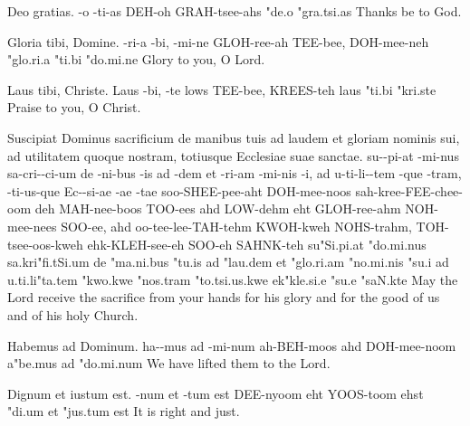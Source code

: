 \newcommand{\LowMassKyriePattern}{Priest K -- \textbf{server K} -- priest K;
\textbf{server C} -- priest C -- \textbf{server C};
priest K -- \textbf{server K} -- priest K.}


  {Deo gratias.}
  {-o -ti-as}
  {DEH-oh GRAH-tsee-ahs}
  {"de.o "gra.tsi.as}
  {Thanks be to God.}

  {Gloria tibi, Domine.}
  {-ri-a -bi, -mi-ne}
  {GLOH-ree-ah TEE-bee, DOH-mee-neh}
  {"glo.ri.a "ti.bi "do.mi.ne}
  {Glory to you, O Lord.}

  {Laus tibi, Christe.}
  {Laus -bi, -te}
  {lows TEE-bee, KREES-teh}
  {laus "ti.bi "kri.ste}
  {Praise to you, O Christ.}

  {Suscipiat Dominus sacrificium de manibus tuis ad laudem et gloriam nominis sui, ad utilitatem quoque nostram, totiusque Ecclesiae suae sanctae.}
  {su--pi-at -mi-nus sa-cri--ci-um de -ni-bus -is ad -dem et -ri-am -mi-nis -i, ad u-ti-li--tem -que -tram, -ti-us-que Ec--si-ae -ae -tae}
  {soo-SHEE-pee-aht DOH-mee-noos sah-kree-FEE-chee-oom deh MAH-nee-boos TOO-ees ahd LOW-dehm eht GLOH-ree-ahm NOH-mee-nees SOO-ee, ahd oo-tee-lee-TAH-tehm KWOH-kweh NOHS-trahm, TOH-tsee-oos-kweh ehk-KLEH-see-eh SOO-eh SAHNK-teh}
  {su"Si.pi.at "do.mi.nus sa.kri"fi.tSi.um de "ma.ni.bus "tu.is ad "lau.dem et "glo.ri.am "no.mi.nis "su.i ad u.ti.li"ta.tem "kwo.kwe "nos.tram "to.tsi.us.kwe ek"kle.si.e "su.e "saN.kte}
  {May the Lord receive the sacrifice from your hands for his glory and for the good of us and of his holy Church.}

  {Habemus ad Dominum.}
  {ha--mus ad -mi-num}
  {ah-BEH-moos ahd DOH-mee-noom}
  {a"be.mus ad "do.mi.num}
  {We have lifted them to the Lord.}

  {Dignum et iustum est.}
  {-num et -tum est}
  {DEE-nyoom eht YOOS-toom ehst}
  {"di.\textltailn um et "jus.tum est}
  {It is right and just.}

